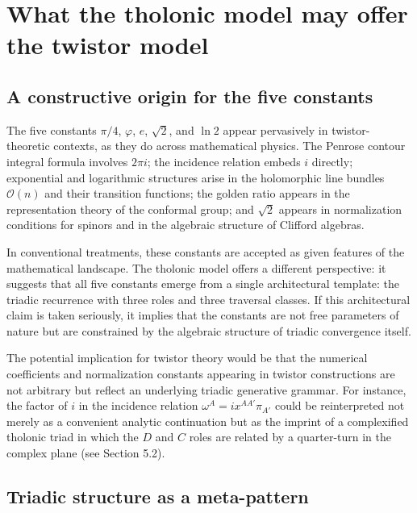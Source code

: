 \documentclass[12pt]{article}
\begin{document}
\section{What the tholonic model may offer the twistor model}\label{what-the-tholonic-model-may-offer-the-twistor-model}

\subsection{A constructive origin for the five constants}\label{a-constructive-origin-for-the-five-constants}

The five constants \(\pi/4\), \(\varphi\), \(e\), \(\sqrt{2}\), and
\(\ln 2\) appear pervasively in twistor-theoretic contexts, as they do
across mathematical physics. The Penrose contour integral formula
involves \(2\pi i\); the incidence relation embeds \(i\) directly;
exponential and logarithmic structures arise in the holomorphic line
bundles \(\mathcal{O}(n)\) and their transition functions; the golden
ratio appears in the representation theory of the conformal group; and
\(\sqrt{2}\) appears in normalization conditions for spinors and in the
algebraic structure of Clifford algebras.

In conventional treatments, these constants are accepted as given
features of the mathematical landscape. The tholonic model offers a
different perspective: it suggests that all five constants emerge from a
single architectural template: the triadic recurrence with three roles
and three traversal classes. If this architectural claim is taken
seriously, it implies that the constants are not free parameters of
nature but are constrained by the algebraic structure of triadic
convergence itself.

The potential implication for twistor theory would be that the numerical
coefficients and normalization constants appearing in twistor
constructions are not arbitrary but reflect an underlying triadic
generative grammar. For instance, the factor of \(i\) in the incidence
relation \(\omega^A = i x^{AA'} \pi_{A'}\) could be reinterpreted not
merely as a convenient analytic continuation but as the imprint of a
complexified tholonic triad in which the \(D\) and \(C\) roles are
related by a quarter-turn in the complex plane (see Section 5.2).

\subsection{Triadic structure as a meta-pattern}\label{triadic-structure-as-a-meta-pattern}
\end{document}
